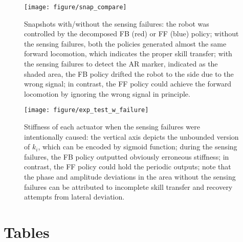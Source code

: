 \documentclass{bmcart}
\begin{document}
\begin{backmatter}
\begin{figure}[!ht]
    \centering
    \texttt{[image: figure/snap\_compare]}
    \caption{Snapshots with/without the sensing failures:
    the robot was controlled by the decomposed FB (red) or FF (blue) policy;
    without the sensing failures, both the policies generated almost the same forward locomotion, which indicates the proper skill transfer;
    with the sensing failures to detect the AR marker, indicated as the shaded area, the FB policy drifted the robot to the side due to the wrong signal;
    in contrast, the FF policy could achieve the forward locomotion by ignoring the wrong signal in principle.
    }
    \label{fig:snap_compare}
\end{figure}

\begin{figure}[!ht]
    \centering
    \texttt{[image: figure/exp\_test\_w\_failure]}
    \caption{Stiffness of each actuator when the sensing failures were intentionally caused:
    the vertical axis depicts the unbounded version of $k_i$, which can be encoded by sigmoid function;
    during the sensing failures, the FB policy outputted obviously erroneous stiffness;
    in contrast, the FF policy could hold the periodic outputs;
    note that the phase and amplitude deviations in the area without the sensing failures can be attributed to incomplete skill transfer and recovery attempts from lateral deviation.
    }
    \label{fig:exp_test_w_failure}
\end{figure}


\clearpage
\section*{Tables}


\end{backmatter}
\end{document}
